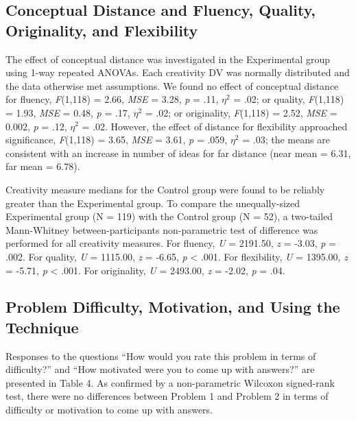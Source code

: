 \documentclass[english,man]{apa6}
\begin{document}
\hypertarget{conceptual-distance-and-fluency-quality-originality-and-flexibility}{%
\subsection{Conceptual Distance and Fluency, Quality, Originality, and
Flexibility}\label{conceptual-distance-and-fluency-quality-originality-and-flexibility}}

The effect of conceptual distance was investigated in the Experimental
group using 1-way repeated ANOVAs. Each creativity DV was normally
distributed and the data otherwise met assumptions. We found no effect
of conceptual distance for fluency, \emph{F}(1,118) = 2.66, \emph{MSE} =
3.28, \emph{p} = .11, \(\eta^2\) = .02; or quality, \emph{F}(1,118) =
1.93, \emph{MSE} = 0.48, \emph{p} = .17, \(\eta^2\) = .02; or
originality, \emph{F}(1,118) = 2.52, \emph{MSE} = 0.002, \emph{p} = .12,
\(\eta^2\) = .02. However, the effect of distance for flexibility
approached significance, \emph{F}(1,118) = 3.65, \emph{MSE} = 3.61,
\emph{p} = .059, \(\eta^2\) = .03; the means are consistent with an
increase in number of ideas for far distance (near mean = 6.31, far mean
= 6.78).

Creativity measure medians for the Control group were found to be
reliably greater than the Experimental group. To compare the
unequally-sized Experimental group (N = 119) with the Control group (N =
52), a two-tailed Mann-Whitney between-participants non-parametric test
of difference was performed for all creativity measures. For fluency,
\emph{U} = 2191.50, \emph{z} = -3.03, \emph{p} = .002. For quality,
\emph{U} = 1115.00, \emph{z} = -6.65, \emph{p} \textless{} .001. For
flexibility, \emph{U} = 1395.00, \emph{z} = -5.71, \emph{p} \textless{}
.001. For originality, \emph{U} = 2493.00, \emph{z} = -2.02, \emph{p} =
.04.

\hypertarget{problem-difficulty-motivation-and-using-the-technique}{%
\subsection{Problem Difficulty, Motivation, and Using the
Technique}\label{problem-difficulty-motivation-and-using-the-technique}}

Responses to the questions \enquote{How would you rate this problem in
terms of difficulty?} and \enquote{How motivated were you to come up
with answers?} are presented in Table 4. As confirmed by a
non-parametric Wilcoxon signed-rank test, there were no differences
between Problem 1 and Problem 2 in terms of difficulty or motivation to
come up with answers.
\end{document}
